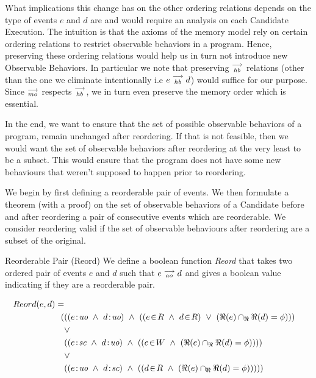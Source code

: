     What implications this change has on the other ordering relations depends on the type of events $e$ and $d$ are and would require an analysis on each Candidate Execution. 
    The intuition is that the axioms of the memory model rely on certain ordering relations to restrict observable behaviors in a program.
    Hence, preserving these ordering relations would help us in turn not introduce new Observable Behaviors.
    In particular we note that preserving $\stackrel{\longrightarrow}{_{hb}}$ relations (other than the one we eliminate intentionally i.e $e\stackrel{\longrightarrow}{_{hb}}d$) would suffice for our purpose. 
    Since $\stackrel{\longrightarrow}{_{mo}}$ respects $\stackrel{\longrightarrow}{_{hb}}$, we in turn even preserve the memory order which is essential.  

    In the end, we want to ensure that the set of possible observable behaviors of a program, remain unchanged after reordering. If that is not feasible, then we would want the set of observable behaviors after reordering at the very least to be a subset. This would ensure that the program does not have some new behaviours that weren't supposed to happen prior to reordering. 
    
    We begin by first defining a reorderable pair of events. We then formulate a theorem (with a proof) on the set of observable behaviors of a Candidate before and after reordering a pair of consecutive events which are reorderable. We consider reordering valid if the set of observable behaviours after reordering are a subset of the original. 

    \begin{definition}{Reorderable Pair (Reord)}
        We define a boolean function \emph{Reord} that takes two ordered pair of events $e$ and $d$ such that $e\stackrel{\longrightarrow}{_{ao}}d$ and gives a boolean value indicating if they are a reorderable pair. 
        
        \begin{align*}
            Reord(e,d) = \\
            (
            &((\et{e}{uo} \ \wedge \ \et{d}{uo}) \ \wedge \ 
                    (   
                        (\event{e}{R} \ \wedge \ \event{d}{R}) \ \vee \ 
                        (\Re(e) \cap_\Re \Re(d) = \phi) 
                    )
            ) \\ &\vee \\
            &((\et{e}{sc} \ \wedge \ \et{d}{uo}) \ \wedge \ 
                    (
                        (\event{e}{W} \ \wedge \ (\Re(e) \cap_\Re \Re(d) = \phi)) 
                    )
            ) \\ &\vee \\
            &((\et{e}{uo} \ \wedge \ \et{d}{sc}) \ \wedge \ 
                    (
                        (\event{d}{R} \ \wedge \ (\Re(e) \cap_\Re \Re(d) = \phi)) 
                    )
            )
            )
        \end{align*}


         
    \end{definition}

